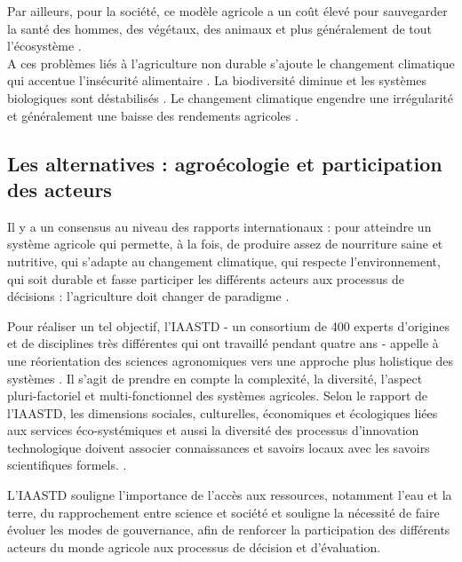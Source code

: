 Par ailleurs, pour la société, ce modèle agricole a un coût élevé pour sauvegarder la santé des hommes, des végétaux, des animaux et plus généralement de tout l'écosystème \cite{pimentel_environmental_2005,bommelear_couts_2011}.\\

A ces problèmes liés à l'agriculture non durable s'ajoute le changement climatique qui accentue l'insécurité alimentaire \cite{smith_agriculture_2007}.
La biodiversité diminue et les systèmes biologiques sont déstabilisés \cite{suarez_les_2002}.
Le changement climatique engendre une irrégularité et généralement une baisse des rendements agricoles \cite{smith_agriculture_2007,lobell_climate_2011}.

\subsection{Les alternatives : agroécologie et participation des acteurs}

Il y a un consensus au niveau des rapports internationaux : 
pour atteindre un système agricole qui permette, à la fois, de produire assez de nourriture saine et nutritive, qui s'adapte au changement climatique, qui respecte l'environnement, qui soit durable et fasse participer les différents acteurs aux processus de décisions : l'agriculture doit changer de paradigme \cite{fao_biodiversity_2010,iaastd_agriculture_2008,mea_ecosystems_2005,fao_declaration_2009,unctad_wake_2013}.

Pour réaliser un tel objectif, l'IAASTD - un consortium de 400 experts d'origines et de disciplines très différentes qui ont travaillé pendant quatre ans - appelle à une réorientation des sciences agronomiques vers une approche plus holistique des systèmes \cite{iaastd_agriculture_2008,even_liaastd_2009}.
Il s'agit de prendre en compte la complexité, la diversité, l'aspect pluri-factoriel et multi-fonctionnel des systèmes agricoles.
Selon le rapport de l'IAASTD, les dimensions sociales, culturelles, économiques et écologiques liées aux services éco-systémiques et aussi la diversité des processus d’innovation technologique doivent associer connaissances et savoirs locaux avec les savoirs scientifiques formels. \cite{iaastd_agriculture_2008,fao_report_2010,mea_ecosystems_2005}.

L'IAASTD souligne l'importance de l'accès aux ressources, notamment l'eau et la terre, du rapprochement entre science et société et souligne la nécessité de faire évoluer les modes de gouvernance, afin de renforcer la participation des différents acteurs du monde agricole aux processus de décision et d’évaluation.

